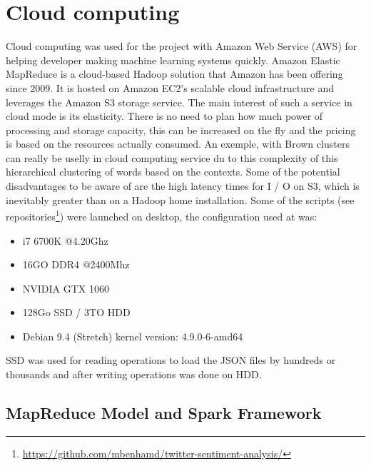 \documentclass{acmtog} %
\begin{document}
\section{Cloud computing}
\label{sec:cloud}

Cloud computing was used for the project with Amazon Web Service (AWS) for helping developer making machine learning systems quickly. 
Amazon Elastic MapReduce is a cloud-based Hadoop solution that Amazon has been offering since 2009. It is hosted on Amazon EC2's scalable cloud infrastructure and leverages the Amazon S3 storage service. The main interest of such a service in cloud mode is its elasticity. There is no need to plan how much power of processing and storage capacity, this can be increased on the fly and the pricing is based on the resources actually consumed. An exemple, with Brown clusters can really be uselly \cite{Marquez16} in cloud computing service du to this complexity of this hierarchical clustering of words based on the contexts.
Some of the potential disadvantages to be aware of are the high latency times for I / O on S3, which is inevitably greater than on a Hadoop home installation. Some of the scripts (see repositories\footnote{\url{https://github.com/mbenhamd/twitter-sentiment-analysis/}}) were launched on desktop, the configuration used at was:
\begin{itemize}
\item  i7 6700K @4.20Ghz
\item  16GO DDR4 @2400Mhz
\item  NVIDIA GTX 1060
\item  128Go SSD / 3TO HDD
\item  Debian 9.4 (Stretch) kernel version: 4.9.0-6-amd64
\end{itemize}

SSD was used for reading operations to load the JSON files by hundreds or thousands and after writing operations was done on HDD.

\subsection{MapReduce Model and Spark Framework}
\label{subsub:mapreduce_spark}
\end{document}
